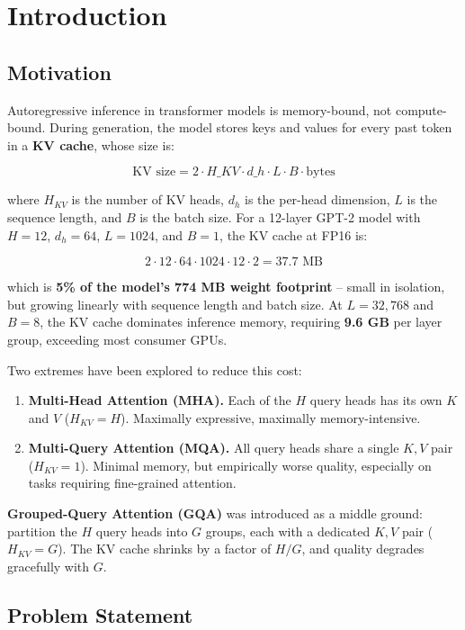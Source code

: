 
\section{Introduction}

\subsection{Motivation}

Autoregressive inference in transformer models is memory-bound, not 
compute-bound. During generation, the model stores keys and values for every 
past token in a \textbf{KV cache}, whose size is:

\[
\text{KV size} = 2 \cdot H\_{KV} \cdot d\_h \cdot L \cdot B \cdot \text{bytes}
\tag{1.1}
\]

where $H_{KV}$ is the number of KV heads, $d_h$ is the per-head dimension, 
$L$ is the sequence length, and $B$ is the batch size. For a 12-layer GPT-2 
model with $H = 12$, $d_h = 64$, $L = 1024$, and $B = 1$, the KV cache at 
FP16 is:

\[
2 \cdot 12 \cdot 64 \cdot 1024 \cdot 12 \cdot 2 = 37.7 \text{ MB}
\tag{1.2}
\]

which is \textbf{5\% of the model's 774 MB weight footprint} -- small in isolation, 
but growing linearly with sequence length and batch size. At $L = 32{,}768$ 
and $B = 8$, the KV cache dominates inference memory, requiring \textbf{9.6 GB} 
per layer group, exceeding most consumer GPUs.

Two extremes have been explored to reduce this cost:

\begin{enumerate}
\item \textbf{Multi-Head Attention (MHA).} Each of the $H$ query heads has its own
  $K$ and $V$ ($H_{KV} = H$). Maximally expressive, maximally memory-intensive.
\item \textbf{Multi-Query Attention (MQA).} All query heads share a single $K, V$
  pair ($H_{KV} = 1$). Minimal memory, but empirically worse quality,
  especially on tasks requiring fine-grained attention.

\end{enumerate}
\textbf{Grouped-Query Attention (GQA)} was introduced as a middle ground: partition 
the $H$ query heads into $G$ groups, each with a dedicated $K, V$ pair 
($H_{KV} = G$). The KV cache shrinks by a factor of $H / G$, and quality 
degrades gracefully with $G$.

\subsection{Problem Statement}

